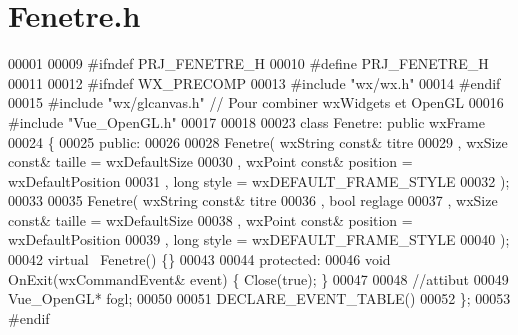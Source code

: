 \section{Fenetre.\+h}
\label{_fenetre_8h_source}

\begin{DoxyCode}
00001 
00009 \textcolor{preprocessor}{#ifndef PRJ\_FENETRE\_H}
00010 \textcolor{preprocessor}{#define PRJ\_FENETRE\_H}
00011 
00012 \textcolor{preprocessor}{#ifndef WX\_PRECOMP}
00013 \textcolor{preprocessor}{#include "wx/wx.h"}
00014 \textcolor{preprocessor}{#endif}
00015 \textcolor{preprocessor}{#include "wx/glcanvas.h"} \textcolor{comment}{// Pour combiner wxWidgets et OpenGL}
00016 \textcolor{preprocessor}{#include "Vue_OpenGL.h"}
00017 
00018 
00023 \textcolor{keyword}{class }Fenetre: \textcolor{keyword}{public} wxFrame
00024 \{
00025     \textcolor{keyword}{public}:
00026     
00028     Fenetre( wxString \textcolor{keyword}{const}& titre 
00029          , wxSize   \textcolor{keyword}{const}& taille   = wxDefaultSize
00030          , wxPoint  \textcolor{keyword}{const}& position = wxDefaultPosition
00031          , \textcolor{keywordtype}{long}            style    = wxDEFAULT\_FRAME\_STYLE
00032          );
00033     
00035     Fenetre( wxString \textcolor{keyword}{const}& titre 
00036          , \textcolor{keywordtype}{bool} reglage
00037          , wxSize   \textcolor{keyword}{const}& taille   = wxDefaultSize
00038          , wxPoint  \textcolor{keyword}{const}& position = wxDefaultPosition
00039          , \textcolor{keywordtype}{long}            style    = wxDEFAULT\_FRAME\_STYLE
00040          );
00042     \textcolor{keyword}{virtual} ~Fenetre() \{\}
00043 
00044     \textcolor{keyword}{protected}:
00046     \textcolor{keywordtype}{void} OnExit(wxCommandEvent& event) \{ Close(\textcolor{keyword}{true}); \}
00047     
00048     \textcolor{comment}{//attibut}
00049     Vue_OpenGL* fogl;
00050 
00051 DECLARE\_EVENT\_TABLE()
00052 \};
00053 \textcolor{preprocessor}{#endif }
\end{DoxyCode}
